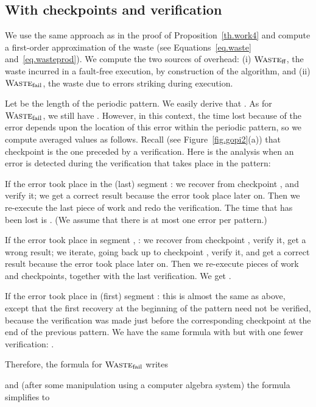 \documentclass[10pt,table]{article}
\newcommand{\ema}[1]{\ensuremath{#1}\xspace}
\newcommand{\Wasteff}{\ema{\textsc{Waste}_{\text{ff}}}}
\newcommand{\Wastefail}{\ema{\textsc{Waste}_{\text{fail}}}}
\begin{document}
\vspace*{-0.3cm}
\subsection{With  checkpoints and  verification}
\label{sec.kc1v}

We use the same approach as in the proof of Proposition~\ref{th.work4} and compute 
a first-order approximation of the waste (see Equations~\eqref{eq.waste} and~\eqref{eq.wasteprod}).
We compute the two
sources of overhead: (i) \Wasteff, the waste incurred in a fault-free
execution, by construction of the algorithm, and (ii)
\Wastefail, the waste due to errors striking during execution. 

Let  be the length of the periodic pattern.
We easily derive that . As for \Wastefail, we still have
 . However, in this context, the time lost because of the error depends upon 
the location of this error within the periodic pattern, so we compute averaged values as follows.
Recall (see Figure~\ref{fig.gopi2}(a)) that checkpoint  is the one preceded by a verification. 
Here is the analysis when an error is detected during the verification that takes place in the pattern:
\begin{compactitem}
\item If the error took place in the (last) segment : we recover from checkpoint , 
and verify it; we get a correct result because the error took place
later on. Then we re-execute the last piece of work and redo the
verification. The time that has been lost is . (We assume that there is at most one error
per pattern.)
\item If the error took place in segment , :  we recover from checkpoint , 
verify it, get a wrong result; we iterate, going back up to checkpoint , verify it, and get a correct result because the error took place later on. Then we re-execute  pieces of work and  checkpoints, together with the last verification. We get .
\item If the error took place in (first) segment : this is almost the same as above, except that the first recovery at the beginning of the pattern need not be verified, because the verification was made just before
the corresponding checkpoint at the end of the previous pattern. We have the same formula with  but with one fewer verification:  .
\end{compactitem}
Therefore, the formula for \Wastefail writes

and (after some manipulation using a computer algebra system) 
the formula simplifies to 
\end{document}
